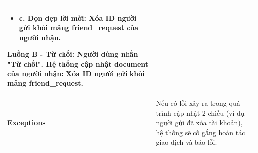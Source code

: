 \documentclass[a4paper, 12pt]{article}
\begin{document}
\begin{longtable}{|p{3.5cm}|p{12cm}|}
\begin{itemize}[nosep, leftmargin=0.5cm, label={}]
		\item c. Dọn dẹp lời mời: Xóa ID người gửi khỏi mảng friend\_request của người nhận.
	\end{itemize}
	\textbf{Luồng B - Từ chối:} \newline
	[B1] Người dùng nhấn "Từ chối". \newline
	[B2] Hệ thống cập nhật document của người nhận: Xóa ID người gửi khỏi mảng friend\_request. \\
	\hline
	\textbf{Exceptions} & Nếu có lỗi xảy ra trong quá trình cập nhật 2 chiều (ví dụ người gửi đã xóa tài khoản), hệ thống sẽ cố gắng hoàn tác giao dịch và báo lỗi. \\
	\hline
\end{longtable}
\vspace{0.5cm}
	
\end{document}
